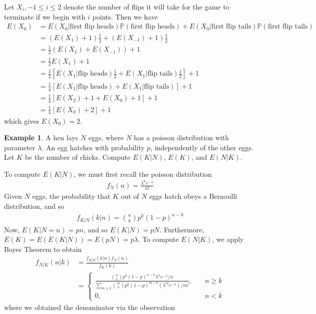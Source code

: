 \documentclass[12pt]{article}
\newcommand{\prob}{\mathbb{P}}
\theoremstyle{plain}
\theoremstyle{definition}
\newtheorem*{example}{Example}
\theoremstyle{remark}
\numberwithin{equation}{section}  %
\begin{document}
Let $X_i, -1 \le i \le 2$ denote the number of flips it will take for the game
to terminate if we begin with $i$ points. Then we have
\begin{align*}
E(X_0) & = E(X_0 | \text{first flip heads})\prob(\text{first flip heads}) +
E(X_0 | \text{first flip tails}) \prob(\text{first flip tails})
\\
& = (E(X_1) + 1) \frac{1}{2} + (E(X_{-1}) + 1) \frac{1}{2}
\\
& = \frac{1}{2}(E(X_1) + E(X_{-1})) + 1
\\
& = \frac{1}{2}E(X_1) + 1
\\
& = \frac{1}{2}[E(X_1 | \text{flip heads}) \frac{1}{2} + E(X_1 | \text{flip
tails}) \frac{1}{2}] + 1
\\
& = \frac{1}{4}[E(X_1 | \text{flip heads}) + E(X_1 | \text{flip
tails})] + 1
\\
& = \frac{1}{4} [ E(X_2) + 1  + E(X_0) + 1] + 1
\\
& = \frac{1}{4}[ E(X_0) + 2] + 1
\end{align*}
which gives $E(X_0) = 2.$
\begin{example}
A hen lays $N$ eggs, where $N$ has a poisson distribution with parameter
$\lambda$. An egg hatches with probability $p$, independently  of the other
eggs. Let $K$ be the number of chicks. Compute $E(K|N)$, $E(K)$, and $E(N | K)$.
\end{example}
To compute $E(K|N)$, we must first recall the poisson distribution
\begin{align*}
f_N(n) = \frac{\lambda^n e^{-\lambda}}{n!}
\end{align*}
Given $N$ eggs, the probability that $K$ out of $N$ eggs hatch obeys a 
Bernoulli distribution, and so 
\begin{align*}
f_{K|N}(k|n) = \binom{n}{k} p^k (1-p)^{n-k}
\end{align*}
Now, $E(K | N = n) = pn$, and so $E(K | N) = pN$. Furthermore, $E(K) = E(E(K
| N	)) = E(pN) = p \lambda$.
To compute $E(N | K)$, we apply Bayes Theorem to obtain
\begin{align*}
f_{N|K}(n|k) & = \frac{f_{K|N}(k|n)f_N(n)}{f_K(k)}
\\
& = \begin{cases}
\frac{\binom{n}{k}p^k (1-p)^{n-k} \lambda^n
e^{-\lambda}/n}{\sum_{m \ge k}
\binom{m}{k} p^k (1 - p)^{m-k} (\lambda^m e^{-\lambda})/m!}
, \quad & n \ge k
\\
0, \quad & n<k
\end{cases}
\end{align*}
where we obtained the denominator via the observation
\end{document}
